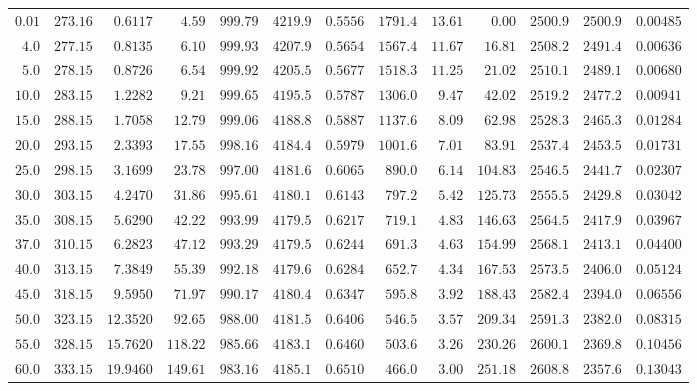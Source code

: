{\begin{tabularx}{\linewidth}{@{}r r r r r r r r r r r r X@{}}
$0.01$ & $273.16$ & $0.6117$ & $4.59$ & $999.79$ & $4219.9$ & $0.5556$ & $1791.4$ & $13.61$ & $0.00$ & $2500.9$ & $2500.9$ & $0.00485$\\
$4.0$ & $277.15$ & $0.8135$ & $6.10$ & $999.93$ & $4207.9$ & $0.5654$ & $1567.4$ & $11.67$ & $16.81$ & $2508.2$ & $2491.4$ & $0.00636$\\
$5.0$ & $278.15$ & $0.8726$ & $6.54$ & $999.92$ & $4205.5$ & $0.5677$ & $1518.3$ & $11.25$ & $21.02$ & $2510.1$ & $2489.1$ & $0.00680$\\
$10.0$ & $283.15$ & $1.2282$ & $9.21$ & $999.65$ & $4195.5$ & $0.5787$ & $1306.0$ & $9.47$ & $42.02$ & $2519.2$ & $2477.2$ & $0.00941$\\
$15.0$ & $288.15$ & $1.7058$ & $12.79$ & $999.06$ & $4188.8$ & $0.5887$ & $1137.6$ & $8.09$ & $62.98$ & $2528.3$ & $2465.3$ & $0.01284$\\
$20.0$ & $293.15$ & $2.3393$ & $17.55$ & $998.16$ & $4184.4$ & $0.5979$ & $1001.6$ & $7.01$ & $83.91$ & $2537.4$ & $2453.5$ & $0.01731$\\
$25.0$ & $298.15$ & $3.1699$ & $23.78$ & $997.00$ & $4181.6$ & $0.6065$ & $890.0$ & $6.14$ & $104.83$ & $2546.5$ & $2441.7$ & $0.02307$\\
$30.0$ & $303.15$ & $4.2470$ & $31.86$ & $995.61$ & $4180.1$ & $0.6143$ & $797.2$ & $5.42$ & $125.73$ & $2555.5$ & $2429.8$ & $0.03042$\\
$35.0$ & $308.15$ & $5.6290$ & $42.22$ & $993.99$ & $4179.5$ & $0.6217$ & $719.1$ & $4.83$ & $146.63$ & $2564.5$ & $2417.9$ & $0.03967$\\
$37.0$ & $310.15$ & $6.2823$ & $47.12$ & $993.29$ & $4179.5$ & $0.6244$ & $691.3$ & $4.63$ & $154.99$ & $2568.1$ & $2413.1$ & $0.04400$\\
$40.0$ & $313.15$ & $7.3849$ & $55.39$ & $992.18$ & $4179.6$ & $0.6284$ & $652.7$ & $4.34$ & $167.53$ & $2573.5$ & $2406.0$ & $0.05124$\\
$45.0$ & $318.15$ & $9.5950$ & $71.97$ & $990.17$ & $4180.4$ & $0.6347$ & $595.8$ & $3.92$ & $188.43$ & $2582.4$ & $2394.0$ & $0.06556$\\
$50.0$ & $323.15$ & $12.3520$ & $92.65$ & $988.00$ & $4181.5$ & $0.6406$ & $546.5$ & $3.57$ & $209.34$ & $2591.3$ & $2382.0$ & $0.08315$\\
$55.0$ & $328.15$ & $15.7620$ & $118.22$ & $985.66$ & $4183.1$ & $0.6460$ & $503.6$ & $3.26$ & $230.26$ & $2600.1$ & $2369.8$ & $0.10456$\\
$60.0$ & $333.15$ & $19.9460$ & $149.61$ & $983.16$ & $4185.1$ & $0.6510$ & $466.0$ & $3.00$ & $251.18$ & $2608.8$ & $2357.6$ & $0.13043$\\

\end{tabularx}}
